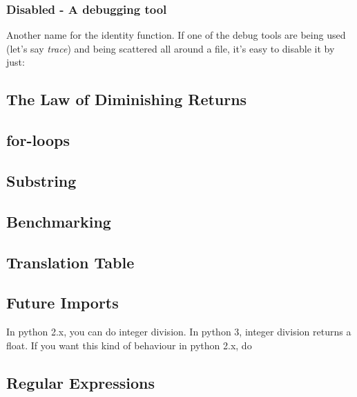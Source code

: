 \documentclass[12pt]{article}
\begin{document}




\subsubsection{Disabled - A debugging tool}

Another name for the identity function. If one of the debug tools are being used (let's say \emph{trace}) and being scattered all around a file, it's easy to disable it by just:







\subsection{The Law of Diminishing Returns}

\subsection{for-loops}


\subsection{Substring}


\subsection{Benchmarking}


\subsection{Translation Table}


\subsection{Future Imports}

In python 2.x, you can do integer division. In python 3, integer division returns a float. If you want this kind of behaviour in python 2.x, do



\subsection{Regular Expressions}
\end{document}
